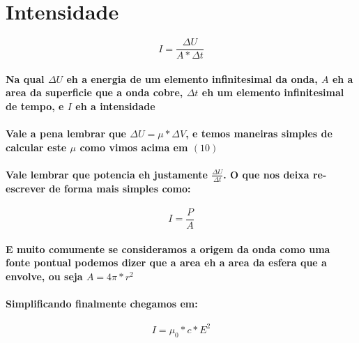 \documentclass[12pt,twoside, a4paper, twocolumn]{article}
\begin{document}
\section*{Intensidade}
\begin{equation}
    I = \frac{\Delta{U}}{A * \Delta{t}}
\end{equation}
\paragraph*{Na qual $\Delta{U}$ eh a energia de um elemento infinitesimal da onda, $A$ eh a area da superficie que a onda cobre, $\Delta{t}$ eh um elemento infinitesimal de tempo, e $I$ eh a intensidade}
\paragraph*{Vale a pena lembrar que $\Delta{U} = \mu * \Delta{V}$, e temos maneiras simples de calcular este $\mu$ como vimos acima em $(10)$}
\paragraph*{Vale lembrar que potencia eh justamente $\frac{\Delta{U}}{\Delta{t}}$. O que nos deixa re-escrever de forma mais simples como:}
\begin{equation}
    I = \frac{P}{A}
\end{equation}
\paragraph*{E muito comumente se consideramos a origem da onda como uma fonte pontual podemos dizer que a area eh a area da esfera que a envolve, ou seja $A = 4\pi * r^2$}
\paragraph*{Simplificando finalmente chegamos em:}
\begin{equation}
    I = \mu_0 * c * E^2
\end{equation}
\end{document}
